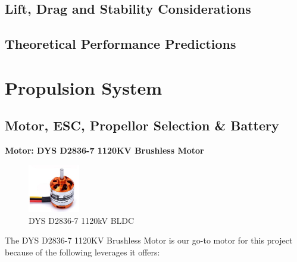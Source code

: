 \documentclass[12pt]{report}
\begin{document}
      \subsection{Lift, Drag and Stability Considerations}
      \subsection{Theoretical Performance Predictions}

    \section{Propulsion System}
      \subsection{Motor, ESC, Propellor Selection \& Battery}
      \vspace{0.5cm}
      
      \textbf{Motor: DYS D2836-7 1120KV Brushless Motor} \\
      \begin{figure}
        \includegraphics[width=0.2\textwidth]{bldc.png}
        \caption{DYS D2836-7 1120kV BLDC}
        \label{fig:bldc1120}
      \end{figure}
      The DYS D2836-7 1120KV Brushless Motor is our go-to motor for this project because of the following leverages it offers:
        
\end{document}
